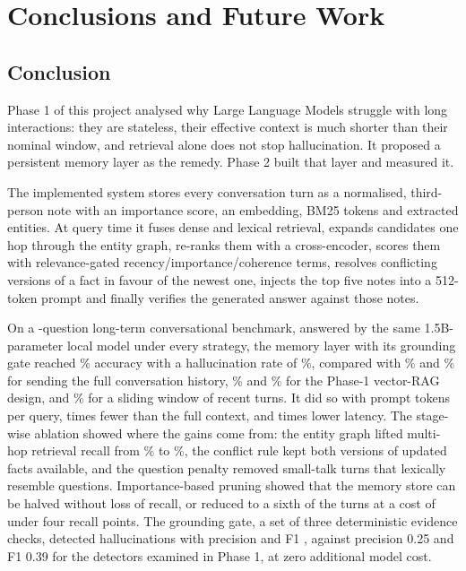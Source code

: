 \chapter{Conclusions and Future Work}

\section{Conclusion}
Phase 1 of this project analysed why Large Language Models struggle with long interactions: they are
stateless, their effective context is much shorter than their nominal window, and retrieval alone does
not stop hallucination. It proposed a persistent memory layer as the remedy. Phase 2 built that layer and
measured it.

The implemented system stores every conversation turn as a normalised, third-person note with an
importance score, an embedding, BM25 tokens and extracted entities. At query time it fuses dense and
lexical retrieval, expands candidates one hop through the entity graph, re-ranks them with a
cross-encoder, scores them with relevance-gated recency/importance/coherence terms, resolves conflicting
versions of a fact in favour of the newest one, injects the top five notes into a 512-token prompt and
finally verifies the generated answer against those notes.

On a \nQuestions-question long-term conversational benchmark, answered by the same 1.5B-parameter local
model under every strategy, the memory layer with its grounding gate reached \accMemGate\% accuracy with a
hallucination rate of \halMemGate\%, compared with \accFull\% and \halFull\% for sending the full
conversation history, \accRag\% and \halRag\% for the Phase-1 vector-RAG design, and \accWin\% for a
sliding window of recent turns. It did so with \tokMem{} prompt tokens per query, \tokRatioFullMem{} times
fewer than the full context, and \latRatioFullMem{} times lower latency. The stage-wise ablation showed
where the gains come from: the entity graph lifted multi-hop retrieval recall from \rFiveVecMH\% to
\rFiveMemMH\%, the conflict rule kept both versions of updated facts available, and the question penalty
removed small-talk turns that lexically resemble questions. Importance-based pruning showed that the memory
store can be halved without loss of recall, or reduced to a sixth of the turns at a cost of under four
recall points. The grounding gate, a set of
three deterministic evidence checks, detected hallucinations with precision \gatePMem{} and F1 \gateFMem,
against precision 0.25 and F1 0.39 for the detectors examined in Phase 1, at zero additional model cost.

